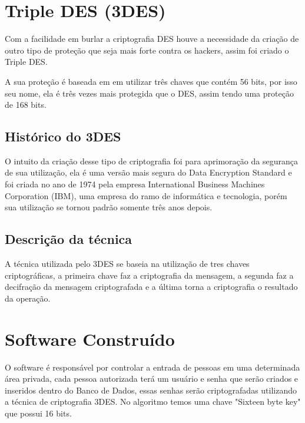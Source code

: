 \newpage
\section{\textbf{Triple DES (3DES)}}

\par Com a facilidade em burlar a criptografia DES houve a necessidade da criação de outro tipo de proteção que seja mais forte contra os hackers, assim foi criado o Triple DES.
\par A sua proteção é baseada em em utilizar três chaves que contém 56 bits, por isso seu nome, ela é três vezes mais protegida que o DES, assim tendo uma proteção de 168 bits.

\subsection{\textbf{Histórico do 3DES}}

\par O intuito da criação desse tipo de criptografia foi para aprimoração da segurança de sua utilização, ela é uma versão mais segura do Data Encryption Standard e foi criada no ano de 1974 pela empresa International Business Machines Corporation (IBM), uma empresa do ramo de informática e tecnologia, porém sua utilização se tornou padrão somente três anos depois.

\subsection{\textbf{Descrição da técnica}}

\par A técnica utilizada pelo 3DES se baseia na utilização de tres chaves criptográficas, a primeira chave faz a criptografia da mensagem, a segunda faz a decifração da mensagem criptografada e a última torna a criptografia o resultado da operação.

\newpage
\section{\textbf{Software Construído}}

\par O software é responsável por controlar a entrada de pessoas em uma determinada área privada, cada pessoa autorizada terá um usuário e senha que serão criados e inseridos dentro do Banco de Dados, essas senhas serão criptografadas utilizando a técnica de criptografia 3DES. No algoritmo temos uma chave "Sixteen byte key" que possui 16 bits.

